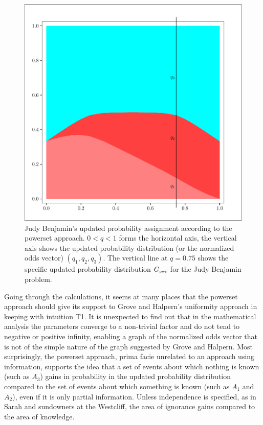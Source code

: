\documentclass[smallextended]{svjour3}       %
\newcommand{\lwv}[0]{0.6}
\begin{document}
\begin{figure}[h]
  \begin{flushright}
    \begin{minipage}[h]{\lwv\linewidth}
      \includegraphics[width=\textwidth]{zeroone-pwst.pdf}
      \caption{Judy Benjamin's updated probability assignment
        according to the powerset approach. $0<q<1$ forms the
        horizontal axis, the vertical axis shows the updated
        probability distribution (or the normalized odds vector)
        $(q_{1},q_{2},q_{3})$. The vertical line at $q=0.75$ shows the
        specific updated probability distribution $G_{\mbox{\tiny
            pws}}$ for the Judy Benjamin problem.}
      \label{fig:pwst}
    \end{minipage}
  \end{flushright}
\end{figure}

Going through the calculations, it seems at many places that the
powerset approach should give its support to Grove and Halpern's
uniformity approach in keeping with intuition T1. It is unexpected to
find out that in the mathematical analysis the parameters converge to
a non-trivial factor and do not tend to negative or positive infinity,
enabling a graph of the normalized odds vector that is not of the
simple nature of the graph suggested by Grove and Halpern. Most
surprisingly, the powerset approach, prima facie unrelated to an
approach using information, supports the idea that a set of events
about which nothing is known (such as $A_{3}$) gains in probability in
the updated probability distribution compared to the set of events
about which something is known (such as $A_{1}$ and $A_{2}$), even if
it is only partial information. Unless independence is specified, as
in Sarah and sundowners at the Westcliff, the area of ignorance gains
compared to the area of knowledge.
\end{document}

